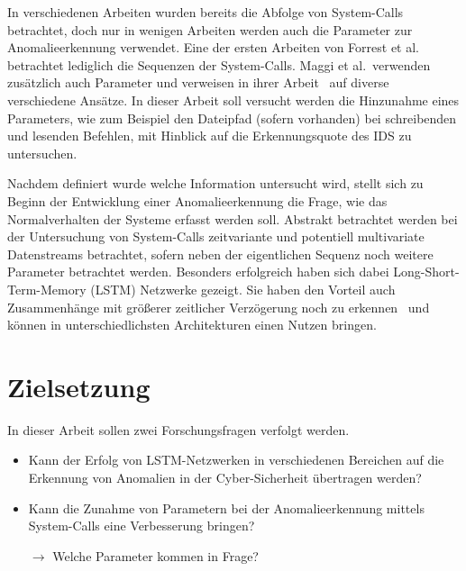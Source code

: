 In verschiedenen Arbeiten wurden bereits die Abfolge von System-Calls betrachtet, doch nur in wenigen Arbeiten werden auch die Parameter zur Anomalieerkennung verwendet. Eine der ersten Arbeiten von Forrest et al.~\cite{FORREST} betrachtet lediglich die Sequenzen der System-Calls.
Maggi et al.\ verwenden zusätzlich auch Parameter und verweisen in ihrer Arbeit~\cite{MAGGI} auf diverse verschiedene Ansätze.
In dieser Arbeit soll versucht werden die Hinzunahme eines Parameters, wie zum Beispiel den Dateipfad (sofern vorhanden) bei schreibenden und lesenden Befehlen, mit Hinblick auf die Erkennungsquote des \ac{IDS} zu untersuchen.

Nachdem definiert wurde welche Information untersucht wird, stellt sich zu Beginn der Entwicklung einer Anomalieerkennung die Frage, wie das Normalverhalten der Systeme erfasst werden soll.
Abstrakt betrachtet werden bei der Untersuchung von System-Calls zeitvariante und potentiell multivariate Datenstreams betrachtet, sofern neben der eigentlichen Sequenz noch weitere Parameter betrachtet werden.
Besonders erfolgreich haben sich dabei Long-Short-Term-Memory (LSTM) Netzwerke gezeigt.
Sie haben den Vorteil auch Zusammenhänge mit größerer zeitlicher Verzögerung noch zu erkennen~\cite{HOCHREITER} und können in unterschiedlichsten Architekturen einen Nutzen bringen. %

\section{Zielsetzung}

In dieser Arbeit sollen zwei Forschungsfragen verfolgt werden.
\begin{itemize}
    \item Kann der Erfolg von LSTM-Netzwerken in verschiedenen Bereichen auf die Erkennung von Anomalien in der Cyber-Sicherheit übertragen werden?
    \item Kann die Zunahme von Parametern bei der Anomalieerkennung mittels System-Calls eine Verbesserung bringen?

        $\rightarrow$ Welche Parameter kommen in Frage?
\end{itemize}

